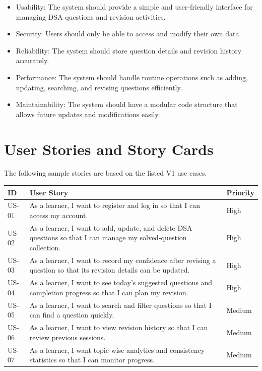 \documentclass[12pt,a4paper]{report}
\begin{document}
\begin{itemize}
    \item Usability: The system should provide a simple and user-friendly interface for managing DSA questions and revision activities.
\end{itemize}
\begin{itemize}
    \item Security: Users should only be able to access and modify their own data.
\end{itemize}
\begin{itemize}
    \item Reliability: The system should store question details and revision history accurately.
\end{itemize}
\begin{itemize}
    \item Performance: The system should handle routine operations such as adding, updating, searching, and revising questions efficiently.
\end{itemize}
 \begin{itemize}
     \item Maintainability: The system should have a modular code structure that allows future updates and modifications easily.
 \end{itemize}

\section{User Stories and Story Cards}
The following sample stories are based on the listed V1 use cases.

\begin{longtable}{|>{\centering\arraybackslash}p{}|p{}|p{}|}
\hline
\textbf{ID} & \textbf{User Story} & \textbf{Priority}\\ \hline
US-01 & As a learner, I want to register and log in so that I can access my account. & High\\ \hline
US-02 & As a learner, I want to add, update, and delete DSA questions so that I can manage my solved-question collection. & High\\ \hline
US-03 & As a learner, I want to record my confidence after revising a question so that its revision details can be updated. & High\\ \hline
US-04 & As a learner, I want to see today's suggested questions and completion progress so that I can plan my revision. & High\\ \hline
US-05 & As a learner, I want to search and filter questions so that I can find a question quickly. & Medium\\ \hline
US-06 & As a learner, I want to view revision history so that I can review previous sessions. & Medium\\ \hline
US-07 & As a learner, I want topic-wise analytics and consistency statistics so that I can monitor progress. & Medium\\ \hline
\end{longtable}
\end{document}
